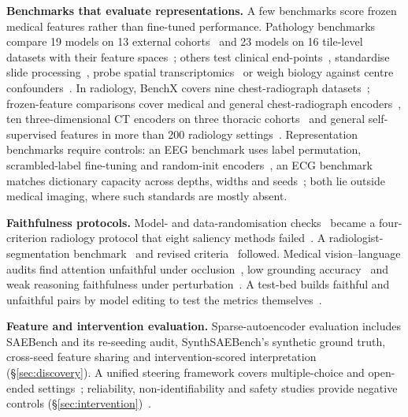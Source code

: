\textbf{Benchmarks that evaluate representations.} A few benchmarks score frozen medical features rather than fine-tuned
performance. Pathology benchmarks compare 19 models on
13 external cohorts~\cite{neidlinger2025benchmark} and 23 models on 16 tile-level datasets with their feature
spaces~\cite{marza2025thunder}; others test clinical end-points~\cite{campanella2024clinical},
standardise slide processing~\cite{zhang2025pathobench}, probe spatial
transcriptomics~\cite{jaume2024hest} or weigh biology against centre
confounders~\cite{dejong2025current}. In radiology, BenchX covers nine
chest-radiograph datasets~\cite{zhou2024benchx}; frozen-feature comparisons cover medical and general
chest-radiograph encoders~\cite{li2025featurequality}, ten three-dimensional CT encoders on three
thoracic cohorts~\cite{chevli2026frozenct} and general self-supervised features in more than 200
radiology settings~\cite{baharoon2023dinov2}. Representation benchmarks require controls: an EEG
benchmark uses label permutation, scrambled-label fine-tuning and random-init
encoders~\cite{zare2026eeg}, an ECG benchmark matches dictionary capacity across depths, widths and
seeds~\cite{duan2026ecginterpbench}; both lie outside medical imaging, where such standards are mostly
absent.

\textbf{Faithfulness protocols.} Model- and data-randomisation checks~\cite{adebayo2018sanity} became a
four-criterion radiology protocol that eight saliency methods failed~\cite{arun2021trustworthiness}. A
radiologist-segmentation benchmark~\cite{saporta2022benchmarking} and revised
criteria~\cite{zhang2023revisiting} followed. Medical vision--language audits find attention unfaithful
under occlusion~\cite{sadanandan2026attention}, low grounding accuracy~\cite{chen2026grounding} and weak
reasoning faithfulness under perturbation~\cite{moll2025faithfulness}. A test-bed builds faithful and unfaithful pairs by model editing to test the metrics
themselves~\cite{zaman2025causal}.

\textbf{Feature and intervention evaluation.} Sparse-autoencoder evaluation includes SAEBench and its re-seeding audit, SynthSAEBench's synthetic ground truth, cross-seed feature sharing and intervention-scored interpretation~\cite{karvonen2025saebench,chanin2026are,chanin2026synthsaebench,paulo2025sparse,paulo2024automatically} (\S\ref{sec:discovery}). A unified steering framework covers multiple-choice and open-ended
settings~\cite{im2025unifiedsteering}; reliability, non-identifiability and safety studies provide
negative controls (\S\ref{sec:intervention})~\cite{tan2024steeringreliability,venkatesh2026nonident,korznikov2025the}.

